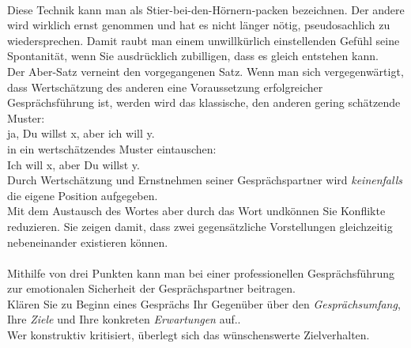 \\
Diese Technik kann man als \glqq Stier-bei-den-Hörnern-packen \grqq bezeichnen. Der andere wird wirklich ernst genommen und hat es nicht länger nötig, pseudosachlich zu wiedersprechen. Damit raubt man einem unwillkürlich einstellenden Gefühl seine Spontanität, wenn Sie ausdrücklich zubilligen, dass es gleich entstehen kann. \\
Der Aber-Satz verneint den vorgegangenen Satz.
Wenn man sich vergegenwärtigt, dass Wertschätzung des anderen eine Voraussetzung erfolgreicher Gesprächsführung ist, werden wird das klassische, den anderen gering schätzende Muster: \\
ja, Du willst x, aber ich will y.\\
in ein wertschätzendes Muster eintauschen:\\
Ich will x, aber Du willst y.\\
Durch Wertschätzung und Ernstnehmen seiner Gesprächspartner wird \emph{keinenfalls} die eigene Position aufgegeben.\\
Mit dem Austausch des Wortes \glqq aber \grqq durch das Wort \glqq und\grqq können Sie Konflikte reduzieren. Sie zeigen damit, dass zwei gegensätzliche Vorstellungen gleichzeitig nebeneinander existieren können.\\
\\
Mithilfe von drei Punkten kann man bei einer professionellen Gesprächsführung zur emotionalen Sicherheit der Gesprächspartner beitragen. \\
Klären Sie zu Beginn eines Gesprächs Ihr Gegenüber über den \emph{Gesprächsumfang}, Ihre \emph{Ziele} und Ihre konkreten \emph{Erwartungen} auf..\\
Wer konstruktiv kritisiert, überlegt sich das wünschenswerte Zielverhalten.\\

